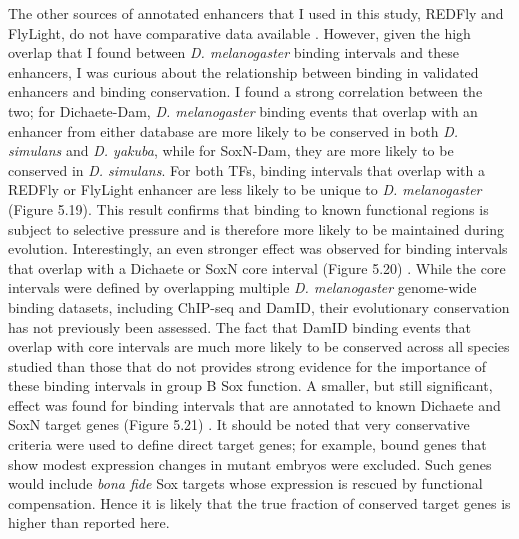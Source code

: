 The other sources of annotated enhancers that I used in this study, REDFly and FlyLight, do not have comparative data available \citep{gallo_redfly_2010,manning_resource_2012}. However, given the high overlap that I found between \emph{D. melanogaster} binding intervals and these enhancers, I was curious about the relationship between binding in validated enhancers and binding conservation. I found a strong correlation between the two; for Dichaete-Dam, \emph{D. melanogaster} binding events that overlap with an enhancer from either database are more likely to be conserved in both \emph{D. simulans} and \emph{D. yakuba}, while for SoxN-Dam, they are more likely to be conserved in \emph{D. simulans}. For both TFs, binding intervals that overlap with a REDFly or FlyLight enhancer are less likely to be unique to \emph{D. melanogaster} (Figure 5.19). This result confirms that binding to known functional regions is subject to selective pressure and is therefore more likely to be maintained during evolution. Interestingly, an even stronger effect was observed for binding intervals that overlap with a Dichaete or SoxN core interval (Figure 5.20) \citep{aleksic_role_2013,ferrero_soxneuro_2014}. While the core intervals were defined by overlapping multiple \emph{D. melanogaster} genome-wide binding datasets, including ChIP-seq and DamID, their evolutionary conservation has not previously been assessed. The fact that DamID binding events that overlap with core intervals are much more likely to be conserved across all species studied than those that do not provides strong evidence for the importance of these binding intervals in group B Sox function. A smaller, but still significant, effect was found for binding intervals that are annotated to known Dichaete and SoxN target genes (Figure 5.21) \citep{aleksic_role_2013,ferrero_soxneuro_2014}. It should be noted that very conservative criteria were used to define direct target genes; for example, bound genes that show modest expression changes in mutant embryos were excluded. Such genes would include \emph{bona fide} Sox targets whose expression is rescued by functional compensation. Hence it is likely that the true fraction of conserved target genes is higher than reported here.

